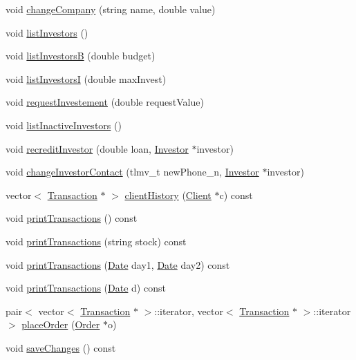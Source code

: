 \begin{DoxyCompactItemize}
\item 
void \hyperlink{class_market_a129446c7c106c1a68d3bedf54f1bbc2b}{change\+Company} (string name, double value)
\item 
void \hyperlink{class_market_a74b4c64f3588d9198ba18d45ae55d5ca}{list\+Investors} ()
\item 
void \hyperlink{class_market_a395055730dcedd57aa6ecbb7b776e91e}{list\+InvestorsB} (double budget)
\item 
void \hyperlink{class_market_a8bc534842a089444397c987a3dec1c56}{list\+InvestorsI} (double max\+Invest)
\item 
void \hyperlink{class_market_a9b1ec16d237155f4524179b393994c5d}{request\+Investement} (double request\+Value)
\item 
void \hyperlink{class_market_a554a30471603fa70ec376b07f60a5f9d}{list\+Inactive\+Investors} ()
\item 
void \hyperlink{class_market_ae96d55536785e519ebff6353d489471e}{recredit\+Investor} (double loan, \hyperlink{class_investor}{Investor} $\ast$investor)
\item 
void \hyperlink{class_market_a7c2e0ff2535534b9a410437b0496b2a3}{change\+Investor\+Contact} (tlmv\+\_\+t new\+Phone\+\_\+n, \hyperlink{class_investor}{Investor} $\ast$investor)
\item 
vector$<$ \hyperlink{class_transaction}{Transaction} $\ast$ $>$ \hyperlink{class_market_aecf8063cd4ed62c3a74a44960b68eb7e}{client\+History} (\hyperlink{class_client}{Client} $\ast$c) const
\item 
void \hyperlink{class_market_ac3a275c01a109a96f3f923911eb70497}{print\+Transactions} () const
\item 
void \hyperlink{class_market_a5176ada7b9889a1c9eb2cb3b7f1aeb0b}{print\+Transactions} (string stock) const
\item 
void \hyperlink{class_market_af8fb6cab3b4c492d753629be2ff82849}{print\+Transactions} (\hyperlink{class_date}{Date} day1, \hyperlink{class_date}{Date} day2) const
\item 
void \hyperlink{class_market_af24b2823a9bd733720dbeb8ec9627e3d}{print\+Transactions} (\hyperlink{class_date}{Date} d) const
\item 
pair$<$ vector$<$ \hyperlink{class_transaction}{Transaction} $\ast$ $>$\+::iterator, vector$<$ \hyperlink{class_transaction}{Transaction} $\ast$ $>$\+::iterator $>$ \hyperlink{class_market_adbc97b770d67a3af3258737a00112dc0}{place\+Order} (\hyperlink{class_order}{Order} $\ast$o)
\item 
void \hyperlink{class_market_a02ceb8abf4d9395d3c80c7494c301ac4}{save\+Changes} () const
\end{DoxyCompactItemize}

